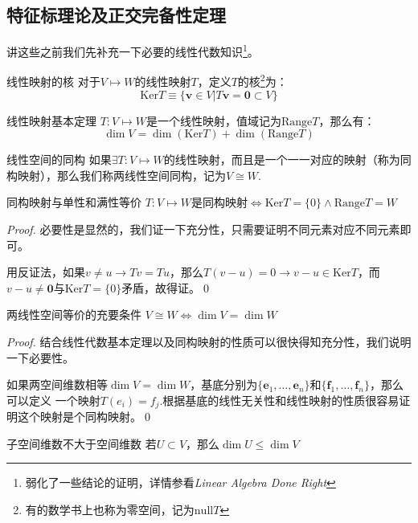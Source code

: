 \subsection{特征标理论及正交完备性定理}
讲这些之前我们先补充一下必要的线性代数知识\footnote{弱化了一些结论的证明，详情参看{\itshape Linear Algebra Done Right}}。
\begin{define}{线性映射的核}
    对于$V\mapsto W$的线性映射$T$，定义$T$的核\footnote{有的数学书上也称为零空间，记为$\mathrm{null}T$}为：
    \[\mathrm{Ker}T\equiv\{\mathbf{v}\in V|T\mathbf{v}=\mathbf{0}\subset V\}\]
\end{define}
\begin{theorem}{线性映射基本定理}
    $T:V\mapsto W$是一个线性映射，值域记为$\mathrm{Range}T$，那么有：
    \begin{equation}
        \dim V=\dim \left(\mathrm{Ker}T\right)+\dim \left(\mathrm{Range}T\right)
    \end{equation}
\end{theorem}
\begin{define}{线性空间的同构}
    如果$\exists T:V\mapsto W$的线性映射，而且是一个一一对应的映射（称为同构映射），那么我们称两线性空间同构，记为$V\cong W$.
\end{define}
\begin{theorem}{同构映射与单性和满性等价}
    $T:V\mapsto W\text{是同构映射}\iff \mathrm{Ker}T=\{0\}\wedge\mathrm{Range}T=W$
\end{theorem}
\begin{proof}
    必要性是显然的，我们证一下充分性，只需要证明不同元素对应不同元素即可。

    用反证法，如果$v\neq u\rightarrow Tv=Tu$，那么$T(v-u)=0\rightarrow v-u\in\mathrm{Ker}T$，而$v-u\neq \mathbf{0}$与$\mathrm{Ker}T=\{0\}$矛盾，故得证。\qed
\end{proof}
\begin{theorem}{两线性空间等价的充要条件}
    $V\cong W\iff \dim V=\dim W$
\end{theorem}
\begin{proof}
    结合线性代数基本定理以及同构映射的性质可以很快得知充分性，我们说明一下必要性。

    如果两空间维数相等$\dim V=\dim W$，基底分别为$\{\mathbf{e}_1,\ldots,\mathbf{e}_n\}$和$\{\mathbf{f}_1,\ldots,\mathbf{f}_n\}$，那么可以定义
    一个映射$T(e_i)=f_j$.根据基底的线性无关性和线性映射的性质很容易证明这个映射是个同构映射。\qed
\end{proof}
\begin{theorem}{子空间维数不大于空间维数}
    若$U\subset{V}$，那么$\dim U\leq \dim V$
\end{theorem}
